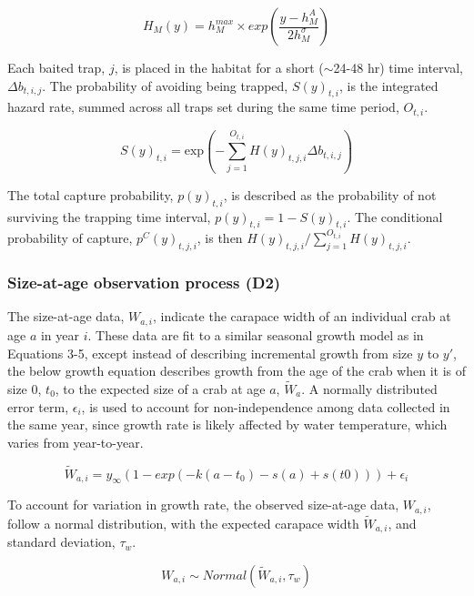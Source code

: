 \documentclass{article}
\begin{document}
\begin{equation}
H_M(y) = h^{max}_M \times exp(\frac{y-h^{A}_M}{2 h^{\sigma}_M})
\end{equation}

Each baited trap, $j$, is placed in the habitat for a short ($\sim$24-48 hr) time interval, $\Delta b_{t,i,j}$. The probability of avoiding being trapped, $S(y)_{t,i}$, is the integrated hazard rate, summed across all traps set during the same time period, $O_{t,i}$.

\begin{equation}
S(y)_{t,i} = \text{exp}\left(-\sum_{j=1}^{O_{t,i}} H(y)_{t,j,i}\Delta b_{t,i,j}\right)
\end{equation}

The total capture probability, $p(y)_{t,i}$, is described as the probability of not surviving the trapping time interval, $p(y)_{t,i} = 1-S(y)_{t,i}$. The conditional probability of capture, $p^C(y)_{t,j,i}$, is then $H(y)_{t,j,i}/\sum_{j=1}^{O_{t,i}}H(y)_{t,j,i}$.

\subsubsection*{Size-at-age observation process (D2)}

The size-at-age data, $W_{a,i}$, indicate the carapace width of an individual crab at age $a$ in year $i$. These data are fit to a similar seasonal growth model as in Equations 3-5, except instead of describing incremental growth from size $y$ to $y'$, the below growth equation describes growth from the age of the crab when it is of size 0, $t_0$, to the expected size of a crab at age $a$, $\widetilde{W}_{a}$. A normally distributed error term, $\epsilon_i$, is used to account for non-independence among data collected in the same year, since growth rate is likely affected by water temperature, which varies from year-to-year.

\begin{equation}
\widetilde{W}_{a,i} = y_{\infty}(1-exp(-k(a-t_0) - s(a) + s(t0))) + \epsilon_i
\end{equation}

To account for variation in growth rate, the observed size-at-age data, $W_{a,i}$, follow a normal distribution, with the expected carapace width $\widetilde{W}_{a,i}$, and standard deviation, $\tau_{w}$.

\begin{equation}
W_{a,i} \sim Normal(\widetilde{W}_{a,i}, \tau_{w})
\end{equation}
\end{document}

